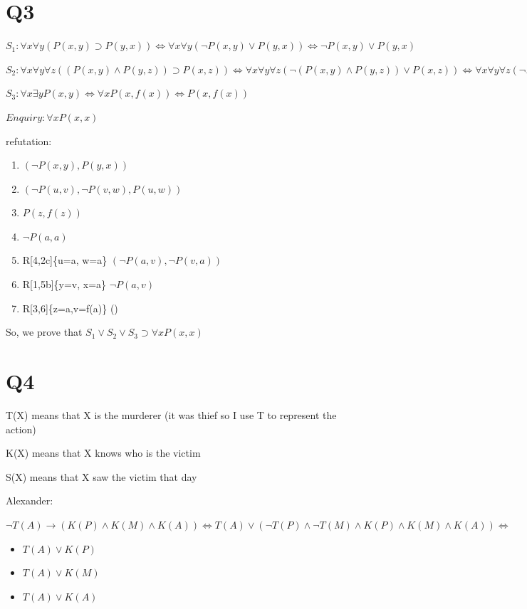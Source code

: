 \documentclass[a4paper, 11pt]{article}
\begin{document}
\section{Q3}
  $S_1:\forall x \forall y(P(x,y) \supset P(y,x)) \iff \forall x \forall y(\lnot P(x,y) \lor P(y,x)) \iff \lnot P(x,y) \lor P(y,x)$

  $S_2:\forall x \forall y \forall z ((P(x,y) \land P(y,z)) \supset P(x,z)) \iff \forall x \forall y \forall z (\lnot(P(x,y) \land P(y,z)) \lor P(x,z)) \iff  \forall x \forall y \forall z (\lnot P(x,y) \lor \lnot P(y,z) \lor P(x,z)) \iff \lnot P(x,y) \lor \lnot P(y,z) \lor P(x,z)$

  $S_3:\forall x \exists y P(x,y) \iff \forall x P(x,f(x)) \iff P(x,f(x))$

  $Enquiry: \forall x P(x,x)$

  refutation:

  \begin{enumerate}[{1.}]
    \item $(\lnot P(x,y),P(y,x))$
    \item $(\lnot P(u,v),\lnot P(v,w),P(u,w))$
    \item $P(z,f(z))$
    \item $\lnot P(a,a)$
    \item R[4,2c]\{u=a, w=a\} $(\lnot P(a,v),\lnot P(v,a))$
    \item R[1,5b]\{y=v, x=a\} $\lnot P(a,v)$
    \item R[3,6]\{z=a,v=f(a)\} ()
  \end{enumerate}

So, we prove that $S_1 \lor S_2 \lor S_3 \supset \forall x P(x,x)$
%
%
\section{Q4}
T(X) means that X is the murderer \; (it was thief so I use T to represent the action)

K(X) means that X knows who is the victim

S(X) means that X saw the victim that day

Alexander:

	$\lnot T(A) \to (K(P) \land K(M) \land K(A)) \iff T(A) \lor (\lnot T(P) \land \lnot T(M) \land K(P) \land K(M) \land K(A)) \iff $
	\begin{itemize}
		\item $T(A) \lor K(P) $
		\item $T(A) \lor K(M) $
		\item $T(A) \lor K(A) $
	\end{itemize}
\end{document}

